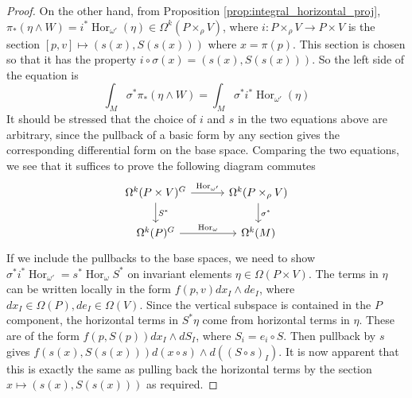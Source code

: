 \begin{proof}
	On the other hand, from Proposition \ref{prop:integral_horizontal_proj}, 
	$\pi_*(\eta\wedge W) = i^*\operatorname{Hor}_{\omega'}(\eta) \in
	\Omega^k(P\times_\rho V)$, where $i:P\times_\rho V \to P\times V$ is the
	section  $[p,v]\mapsto (s(x),S(s(x)))$ where $x=\pi(p)$. This section is
	chosen so that it has the property $i\circ \sigma(x) =
	(s(x),S(s(x)))$. 
	So the left side of the equation is  
	\[
	\int_M \sigma^*\pi_*(\eta\wedge W)
	=\int_M \sigma^*i^* \operatorname{Hor}_{\omega'}(\eta)
	\] 
It should be stressed that the choice of $i$ and  $s$ in the two equations above
are arbitrary, since the pullback of a basic form by any section gives the
corresponding differential form on the base space. Comparing the two equations,
we see that it suffices to prove the following diagram commutes
\[\begin{tikzcd}[column sep = 3em]
		{\Omega^k(P\times V)^G} & {\Omega^k(P\times_\rho V)} \\
			{\Omega^k(P)^G} & {\Omega^k(M)}
				\arrow["{\operatorname{Hor}_\omega}", from=2-1, to=2-2]
					\arrow["{\operatorname{Hor}_{\omega'}}", from=1-1, to=1-2]
						\arrow["{\sigma^*}", from=1-2, to=2-2]
							\arrow["{S^*}", from=1-1, to=2-1]
	\end{tikzcd}\]
	If we include the pullbacks to the base spaces, we need to show
	$\sigma^*i^*\operatorname{Hor}_{\omega'}
	= s^*\operatorname{Hor}_{\omega}S^*$ on invariant elements 
	$\eta\in\Omega(P\times V)$. The terms in $\eta$ can be written locally in 
	the form $f(p,v)dx_I\wedge de_I$, where  $dx_I \in \Omega(P),de_I\in\Omega(V)$. 
	Since the vertical subspace is contained in the $P$ component,
	the horizontal terms in $S^*\eta$ come from horizontal terms in
	$\eta$. These are of the form $f(p,S(p))dx_I \wedge dS_I$, where $S_i =
	e_i\circ S$. Then pullback by $s$ gives $f(s(x),S(s(x))) d(x\circ s) \wedge
	d((S\circ s)_I)$. It is now apparent that this is exactly the same 
	as pulling back the horizontal terms by the section $x\mapsto(s(x),
	S(s(x)))$ as required.

\end{proof}
